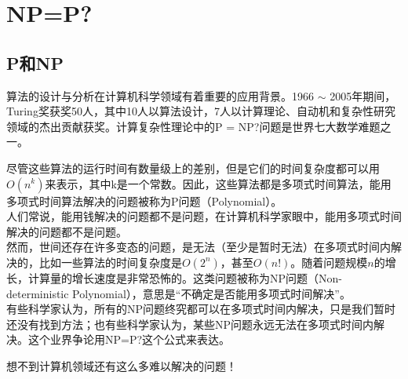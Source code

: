 \newpage

\section{NP=P?}

\subsection{P和NP}

算法的设计与分析在计算机科学领域有着重要的应用背景。1966 $ \sim $ 2005年期间，Turing奖获奖50人，其中10人以算法设计，7人以计算理论、自动机和复杂性研究领域的杰出贡献获奖。计算复杂性理论中的P = NP?问题是世界七大数学难题之一。

\begin{table}[H]
	\centering
	\caption{常见算法时间复杂度}
\end{table}

尽管这些算法的运行时间有数量级上的差别，但是它们的时间复杂度都可以用$ O(n^k) $来表示，其中k是一个常数。因此，这些算法都是多项式时间算法，能用多项式时间算法解决的问题被称为P问题（Polynomial）。\\

人们常说，能用钱解决的问题都不是问题，在计算机科学家眼中，能用多项式时间解决的问题都不是问题。\\

然而，世间还存在许多变态的问题，是无法（至少是暂时无法）在多项式时间内解决的，比如一些算法的时间复杂度是$ O(2^n) $，甚至$ O(n!) $。随着问题规模$ n $的增长，计算量的增长速度是非常恐怖的。这类问题被称为NP问题（Non-deterministic Polynomial），意思是“不确定是否能用多项式时间解决”。\\

有些科学家认为，所有的NP问题终究都可以在多项式时间内解决，只是我们暂时还没有找到方法；也有些科学家认为，某些NP问题永远无法在多项式时间内解决。这个业界争论用NP=P?这个公式来表达。

想不到计算机领域还有这么多难以解决的问题！\\

